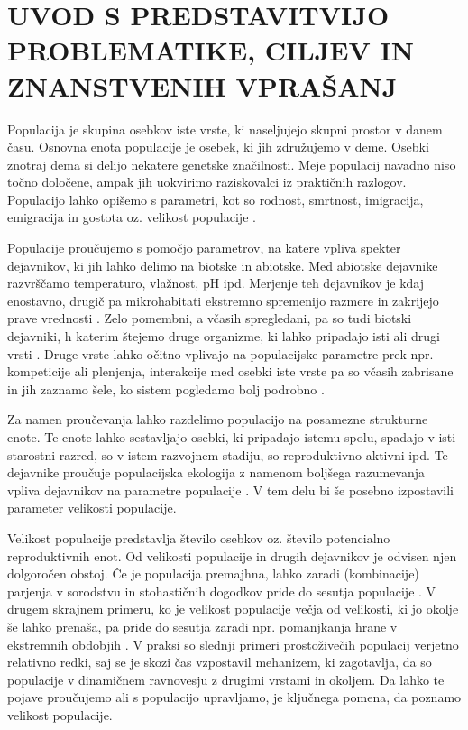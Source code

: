 \section{UVOD S PREDSTAVITVIJO PROBLEMATIKE, CILJEV IN ZNANSTVENIH VPRAŠANJ}
Populacija je skupina osebkov iste vrste, ki naseljujejo skupni prostor v danem času. Osnovna enota populacije je osebek, ki jih združujemo v deme. Osebki znotraj dema si delijo nekatere genetske značilnosti. Meje populacij navadno niso točno določene, ampak jih uokvirimo raziskovalci iz praktičnih razlogov. Populacijo lahko opišemo s parametri, kot so rodnost, smrtnost, imigracija, emigracija in gostota oz. velikost populacije \citep{krebs_ecology_2001}.

Populacije proučujemo s pomočjo parametrov, na katere vpliva spekter dejavnikov, ki jih lahko delimo na biotske in abiotske. Med abiotske dejavnike razvrščamo temperaturo, vlažnost, pH ipd. Merjenje teh dejavnikov je kdaj enostavno, drugič pa mikrohabitati ekstremno spremenijo razmere in zakrijejo prave vrednosti \citep{cockburn_microhabitat_1983}. Zelo pomembni, a včasih spregledani, pa so tudi biotski dejavniki, h katerim štejemo druge organizme, ki lahko pripadajo isti ali drugi vrsti \citep{krebs_ecology_2001}. Druge vrste lahko očitno vplivajo na populacijske parametre prek npr. kompeticije ali plenjenja, interakcije med osebki iste vrste pa so včasih zabrisane in jih zaznamo šele, ko sistem pogledamo bolj podrobno \citep{lustrik_coexistence_2011}.

Za namen proučevanja lahko razdelimo populacijo na posamezne strukturne enote. Te enote lahko sestavljajo osebki, ki pripadajo istemu spolu, spadajo v isti starostni razred, so v istem razvojnem stadiju, so reproduktivno aktivni ipd. Te dejavnike proučuje populacijska ekologija z namenom boljšega razumevanja vpliva dejavnikov na parametre populacije \citep{krebs_ecology_2001}. V tem delu bi še posebno izpostavili parameter velikosti populacije.

Velikost populacije predstavlja število osebkov oz. število potencialno reproduktivnih enot. Od velikosti populacije in drugih dejavnikov je odvisen njen dolgoročen obstoj. Če je populacija premajhna, lahko zaradi (kombinacije) parjenja v sorodstvu in stohastičnih dogodkov pride do sesutja populacije \citep{amos_when_2001}. V drugem skrajnem primeru, ko je velikost populacije večja od velikosti, ki jo okolje še lahko prenaša, pa pride do sesutja zaradi npr. pomanjkanja hrane v ekstremnih obdobjih \citep{klein_introduction_1968}. V praksi so slednji primeri prostoživečih populacij verjetno relativno redki, saj se je skozi čas vzpostavil mehanizem, ki zagotavlja, da so populacije v dinamičnem ravnovesju z drugimi vrstami in okoljem. Da lahko te pojave proučujemo ali s populacijo upravljamo, je ključnega pomena, da poznamo velikost populacije.


